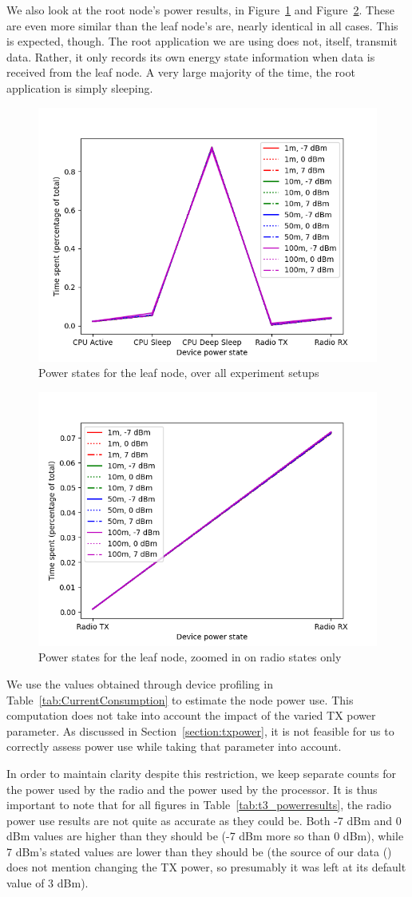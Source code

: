 \documentclass[conference]{IEEEtran}
\newcommand{\figref}[1]{Figure~\ref{#1}}
\newcommand{\secref}[1]{Section~\ref{#1}}
\newcommand{\tabref}[1]{Table~\ref{#1}}
\renewcommand\_{\textunderscore\allowbreak}
\begin{document}
We also look at the root node's power results, in \figref{fig:root_allstates} and \figref{fig:root_radiostates}. These are even more similar than the leaf node's are, nearly identical in all cases. This is expected, though. The root application we are using does not, itself, transmit data. Rather, it only records its own energy state information when data is received from the leaf node. A very large majority of the time, the root application is simply sleeping. 
\begin{figure}[htbp]
	\centering
	\includegraphics[width=.48\textwidth,keepaspectratio]{figures/root_allstates}
	\caption{Power states for the leaf node, over all experiment setups}
	\label{fig:root_allstates}
\end{figure}
\begin{figure}[htbp]
	\centering
	\includegraphics[width=.48\textwidth,keepaspectratio]{figures/root_rx_tx}
	\caption{Power states for the leaf node, zoomed in on radio states only}
	\label{fig:root_radiostates}
\end{figure}


We use the values obtained through device profiling in \tabref{tab:CurrentConsumption} to estimate the node power use. This computation does not take into account the impact of the varied TX power parameter. As discussed in \secref{section:txpower}, it is not feasible for us to correctly assess power use while taking that parameter into account. 

In order to maintain clarity despite this restriction, we keep separate counts for the power used by the radio and the power used by the processor. It is thus important to note that for all figures in \tabref{tab:t3_powerresults}, the radio power use results are not quite as accurate as they could be. Both -7 dBm and 0 dBm values are higher than they should be (-7 dBm more so than 0 dBm), while 7 dBm's stated values are lower than they should be (the source of our data (\cite{EnergyConsumption}) does not mention changing the TX power, so presumably it was left at its default value of 3 dBm). 
\end{document}
